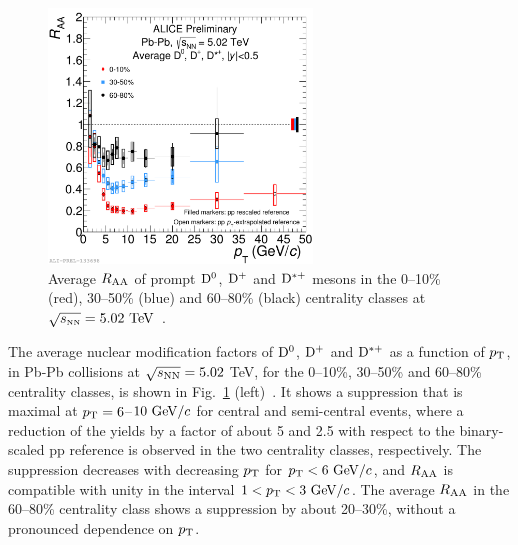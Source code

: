 \begin{figure}[!ht]
  \centering
    \includegraphics[width=7cm]{FigCap2/2017-Jul-05-DmesonAverage_010_3050_6080_comparison_04July2017.pdf}
  \caption{Average $R_{\rm AA}$ 
  of prompt ${\rm D^0}$, ${\rm D^+}$ and ${\rm D^{*+}}$ mesons in the 0--10\% (red), 30--50\% (blue) and 60--80\% (black) centrality classes at $\sqrt{s_{\rm \scriptscriptstyle NN}}=5.02~\mathrm{TeV}$~\cite{ALICE-PUBLIC-2017-003}. }
  \label{fig:Raa}
\end{figure}

The average nuclear modification factors of ${\rm D^0}$, ${\rm D^+}$ and ${\rm D^{*+}}$ as a function of
$p_{\rm T}$, in Pb-Pb collisions at $\sqrt{s_{\rm NN}} = 5.02 $ TeV, for the 0--10\%, 30--50\% and 60--80\% centrality classes,
is shown in Fig.~\ref{fig:Raa} (left)~\cite{ALICE-PUBLIC-2017-003}. It shows a suppression that is
maximal at $p_{\rm T}=6$--$10~\mathrm{GeV}/c$ for central and semi-central events, where a reduction of the yields by
a factor of about 5 and 2.5 with respect to the binary-scaled pp reference is observed 
in the two centrality classes, respectively.
The suppression decreases with decreasing $p_{\rm T}$ for $p_{\rm T}<6~\mathrm{GeV}/c$, and 
$R_{\rm AA}$ is compatible with unity  in the interval $1<p_{\rm T}<3~\mathrm{GeV}/c$.
The average $R_{\rm AA}$ in the 60--80\% centrality class shows a suppression by about 20--30\%, without a pronounced dependence on $p_{\rm T}$.\\



